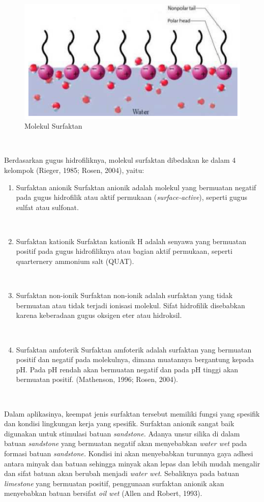 \documentclass[
]{book}
\providecommand{\tightlist}{%
  \setlength{\itemsep}{0pt}\setlength{\parskip}{0pt}}
\begin{document}
\begin{figure}

{\centering \includegraphics[width=0.5\linewidth]{images/chemical/molekul} 

}

\caption{Molekul Surfaktan}\label{fig:unnamed-chunk-53}
\end{figure}

~

Berdasarkan gugus hidrofiliknya, molekul surfaktan dibedakan ke dalam 4 kelompok (Rieger, 1985; Rosen, 2004), yaitu:

\begin{enumerate}
\def\labelenumi{\alph{enumi}.}
\tightlist
\item
  Surfaktan anionik
  Surfaktan anionik adalah molekul yang bermuatan negatif pada gugus hidrofilik atau aktif permukaan (\emph{surface-active}), seperti gugus sulfat atau sulfonat.

  ~
\item
  Surfaktan kationik
  Surfaktan kationik H adalah senyawa yang bermuatan positif pada gugus hidrofiliknya atau bagian aktif permukaan, seperti quarternery ammonium salt (QUAT).

  ~
\item
  Surfaktan non-ionik
  Surfaktan non-ionik adalah surfaktan yang tidak bermuatan atau tidak terjadi ionisasi molekul. Sifat hidrofilik disebabkan karena keberadaan gugus oksigen eter atau hidroksil.

  ~
\item
  Surfaktan amfoterik
  Surfaktan amfoterik adalah surfaktan yang bermuatan positif dan negatif pada molekulnya, dimana muatannya bergantung kepada pH. Pada pH rendah akan bermuatan negatif dan pada pH tinggi akan bermuatan positif. (Mathenson, 1996; Rosen, 2004).

  ~
\end{enumerate}

Dalam aplikasinya, keempat jenis surfaktan tersebut memiliki fungsi yang spesifik dan kondisi lingkungan kerja yang spesifik. Surfaktan anionik sangat baik digunakan untuk stimulasi batuan \emph{sandstone.} Adanya unsur silika di dalam batuan \emph{sandstone} yang bermuatan negatif akan menyebabkan \emph{water wet} pada formasi batuan \emph{sandstone.} Kondisi ini akan menyebabkan turunnya gaya adhesi antara minyak dan batuan sehingga minyak akan lepas dan lebih mudah mengalir dan sifat batuan akan berubah menjadi \emph{water wet}. Sebaliknya pada batuan \emph{limestone} yang bermuatan positif, penggunaan surfaktan anionik akan menyebabkan batuan bersifat \emph{oil wet} (Allen and Robert, 1993).
\end{document}
